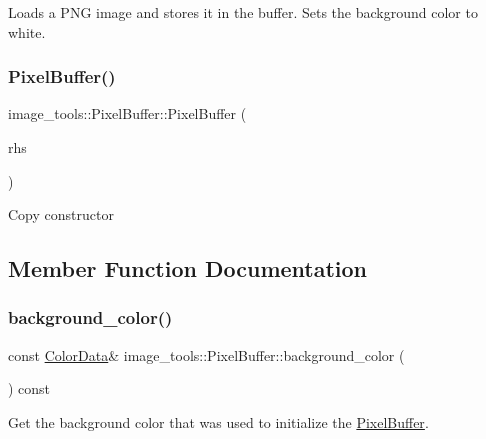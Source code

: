 Loads a P\+NG image and stores it in the buffer. Sets the background color to white. \mbox{\label{classimage__tools_1_1PixelBuffer_a25b0c7d5686807d187ee799a5fbb1121}} 
\subsubsection{\texorpdfstring{Pixel\+Buffer()}{PixelBuffer()}\hspace{0.1cm}{\footnotesize\ttfamily [3/3]}}
{\footnotesize\ttfamily image\+\_\+tools\+::\+Pixel\+Buffer\+::\+Pixel\+Buffer (\begin{DoxyParamCaption}\item[{const \hyperlink{classimage__tools_1_1PixelBuffer}{Pixel\+Buffer} \&}]{rhs }\end{DoxyParamCaption})}

Copy constructor 

\subsection{Member Function Documentation}
\mbox{\label{classimage__tools_1_1PixelBuffer_a3d6b71aeb5d7ec8a204aac67df7b83ac}} 
\subsubsection{\texorpdfstring{background\+\_\+color()}{background\_color()}}
{\footnotesize\ttfamily const \hyperlink{classimage__tools_1_1ColorData}{Color\+Data}\& image\+\_\+tools\+::\+Pixel\+Buffer\+::background\+\_\+color (\begin{DoxyParamCaption}{ }\end{DoxyParamCaption}) const\hspace{0.3cm}{\ttfamily [inline]}}



Get the background color that was used to initialize the \hyperlink{classimage__tools_1_1PixelBuffer}{Pixel\+Buffer}. 

